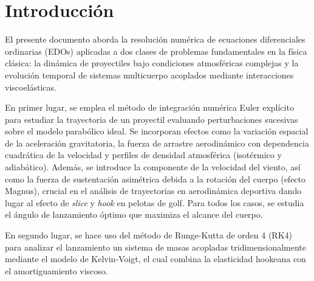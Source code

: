 \section{Introducción}

El presente documento aborda la resolución numérica de ecuaciones diferenciales ordinarias (EDOs) aplicadas a dos clases de problemas fundamentales en la física clásica: la dinámica de proyectiles bajo condiciones atmosféricas complejas y la evolución temporal de sistemas multicuerpo acoplados mediante interacciones viscoelásticas.

En primer lugar, se emplea el método de integración numérica Euler explícito para estudiar la trayectoria de un proyectil  evaluando perturbaciones sucesivas sobre el modelo parabólico ideal. Se incorporan efectos como la variación espacial de la aceleración gravitatoria, la fuerza de arrastre aerodinámico con dependencia cuadrática de la velocidad y perfiles de densidad atmosférica (isotérmico y adiabático). Además, se introduce la componente de la velocidad del viento, así como la fuerza de sustentación asimétrica debida a la rotación del cuerpo (efecto Magnus), crucial en el análisis de trayectorias en aerodinámica deportiva dando lugar al efecto de \textit{slice} y \textit{hook} en pelotas de golf. Para todos los casos, se estudia el ángulo de lanzamiento óptimo que maximiza el alcance del cuerpo.

En segundo lugar, se hace uso del método de Runge-Kutta de orden 4 (RK4) para analizar el lanzamiento un sistema de masas acopladas tridimensionalmente mediante el modelo de Kelvin-Voigt, el cual combina la elasticidad hookeana con el amortiguamiento viscoso.

